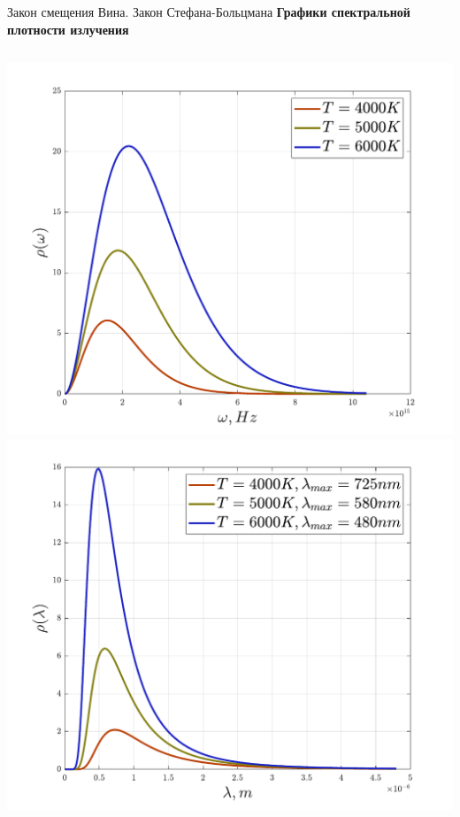 \documentclass[12]{beamer}
\begin{document}
\begin{frame}[t]{Закон смещения Вина. Закон Стефана-Больцмана}\scriptsize
\textbf{Графики спектральной плотности излучения}
\begin{columns}[onlytextwidth]
\includegraphics[width=\textwidth]{Seminar_01/pics/pic_04_left.pdf}
\includegraphics[width=\textwidth]{Seminar_01/pics/pic_04_right.pdf}
\end{columns}
\end{frame}
\end{document}
